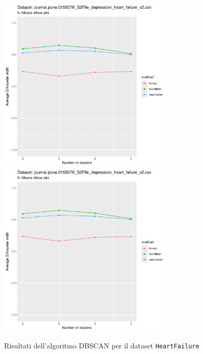 \documentclass[a4paper, 12pt]{report}
\begin{document}
			\begin{figure}[H]
				\centering
				\includegraphics[width = 0.75\textwidth, height = 0.45\textheight, page = 5]{
					results/results_HeartFailure.csv.pdf
				}
				\includegraphics[width = 0.75\textwidth, height = 0.45\textheight, page = 6]{
					results/results_HeartFailure.csv.pdf
				}
				\caption{Risultati dell'algoritmo DBSCAN per il dataset
				\texttt{HeartFailure}}
				\label{fig:dbscan1}
			\end{figure}
\end{document}
